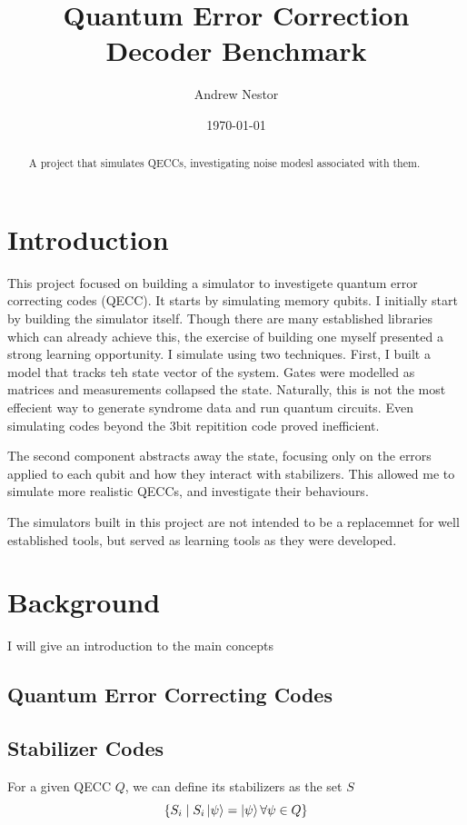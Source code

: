 \documentclass[a4paper,12pt]{article}
\title{Quantum Error Correction Decoder Benchmark}
\author{Andrew Nestor}
\date{\today}
\begin{document}
\maketitle

\begin{abstract}
A project that simulates QECCs, investigating noise modesl associated with them.

\end{abstract}

\section{Introduction}

This project focused on building a simulator to investigete quantum error correcting codes (QECC). It starts by simulating memory qubits.
I initially start by building the simulator itself. Though there are many established libraries which can already achieve this, the exercise of building one myself presented a strong learning opportunity.
I simulate using two techniques. First, I built a model that tracks teh state vector of the system. Gates were modelled as matrices and measurements collapsed the state.
Naturally, this is not the most effecient way to generate syndrome data and run quantum circuits. Even simulating codes beyond the 3bit repitition code proved inefficient.

The second component abstracts away the state, focusing only on the errors applied to each qubit and how they interact with stabilizers. This allowed me to simulate more realistic QECCs, and investigate their behaviours.

The simulators built in this project are not intended to be a replacemnet for well established tools, but served as learning tools as they were developed.

\section{Background}

I will give an introduction to the main concepts 

\subsection{Quantum Error Correcting Codes}
\subsection{Stabilizer Codes}
For a given QECC $Q$, we can define its stabilizers as the set $S$
\begin{equation}
    \{ S_i \; | \; S_i\ket{\psi} = \ket{\psi} \forall \psi \in Q \}
\end{equation}
\end{document}
